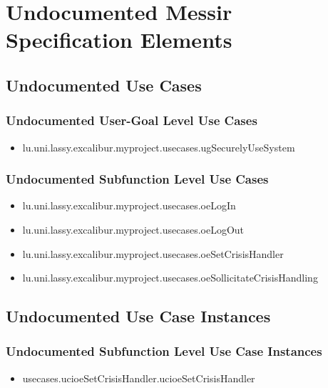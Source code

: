 	
\chapter{Undocumented Messir Specification Elements}


\section[Undocumented Use Cases]{Undocumented Use Cases}


\subsection[Undocumented Use Cases - User-Goal Level]{Undocumented User-Goal Level Use Cases}
\begin{itemize}
\item lu.uni.lassy.excalibur.myproject.usecases.ugSecurelyUseSystem 
\end{itemize}

\subsection[Undocumented Use Cases - Subfunction Level]{Undocumented Subfunction Level Use Cases}
\begin{itemize}
\item lu.uni.lassy.excalibur.myproject.usecases.oeLogIn 
\item lu.uni.lassy.excalibur.myproject.usecases.oeLogOut 
\item lu.uni.lassy.excalibur.myproject.usecases.oeSetCrisisHandler 
\item lu.uni.lassy.excalibur.myproject.usecases.oeSollicitateCrisisHandling 
\end{itemize}





\section[Undocumented Use Case Instances]{Undocumented Use Case Instances}



\subsection[Undocumented Use Case Instances - Subfunction Level]{Undocumented Subfunction Level Use Case Instances}
\begin{itemize}
\item usecases.ucioeSetCrisisHandler.ucioeSetCrisisHandler 
\end{itemize}



